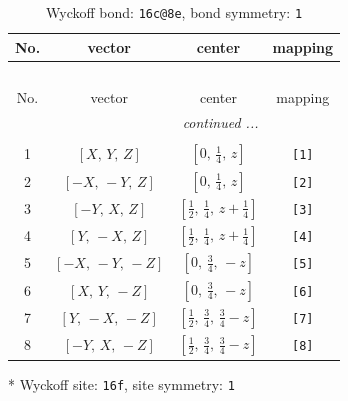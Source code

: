 \documentclass[fleqn,8pt]{jsarticle}
\begin{document}
\renewcommand{\arraystretch}{1.2}
\begin{longtable}{cccc}
\caption{Wyckoff bond: {\tt 16c@8e}, bond symmetry: {\tt 1}}
 \\
 \hline \hline
No. & vector & center & mapping \\ \hline \endfirsthead

\multicolumn{3}{l}{\tablename\ \thetable{}} \\
 \hline \hline
No. & vector & center & mapping \\ \hline \endhead

 \hline \hline
\multicolumn{3}{r}{\footnotesize\it continued ...} \\ \endfoot

 \hline \hline
\multicolumn{3}{r}{} \\ \endlastfoot

1 & $\left[ X,\, Y,\, Z \right]$ & $\left[ 0,\, \frac{1}{4},\, z \right]$ & {\tt [1]} \\ \hline
2 & $\left[ - X,\, - Y,\, Z \right]$ & $\left[ 0,\, \frac{1}{4},\, z \right]$ & {\tt [2]} \\ \hline
3 & $\left[ - Y,\, X,\, Z \right]$ & $\left[ \frac{1}{2},\, \frac{1}{4},\, z + \frac{1}{4} \right]$ & {\tt [3]} \\ \hline
4 & $\left[ Y,\, - X,\, Z \right]$ & $\left[ \frac{1}{2},\, \frac{1}{4},\, z + \frac{1}{4} \right]$ & {\tt [4]} \\ \hline
5 & $\left[ - X,\, - Y,\, - Z \right]$ & $\left[ 0,\, \frac{3}{4},\, - z \right]$ & {\tt [5]} \\ \hline
6 & $\left[ X,\, Y,\, - Z \right]$ & $\left[ 0,\, \frac{3}{4},\, - z \right]$ & {\tt [6]} \\ \hline
7 & $\left[ Y,\, - X,\, - Z \right]$ & $\left[ \frac{1}{2},\, \frac{3}{4},\, \frac{3}{4} - z \right]$ & {\tt [7]} \\ \hline
8 & $\left[ - Y,\, X,\, - Z \right]$ & $\left[ \frac{1}{2},\, \frac{3}{4},\, \frac{3}{4} - z \right]$ & {\tt [8]} \\
\end{longtable}
* Wyckoff site: {\tt 16f}, site symmetry: {\tt 1}
\renewcommand{\arraystretch}{1.2}
\end{document}

